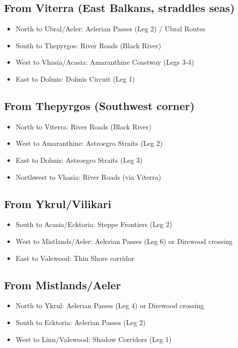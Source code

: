 \documentclass[12pt,oneside]{book}
\begin{document}
\subsection{From Viterra (East Balkans, straddles seas)}
\begin{itemize}
\item North to Ubral/Aeler: Aelerian Passes (Leg 2) / Ubral Routes
\item South to Thepyrgos: River Roads (Black River)
\item West to Vhasia/Acasia: Amaranthine Coastway (Legs 3-4)
\item East to Dolmis: Dolmis Circuit (Leg 1)
\end{itemize}

\subsection{From Thepyrgos (Southwest corner)}
\begin{itemize}
\item North to Viterra: River Roads (Black River)
\item West to Amaranthine: Astroegro Straits (Leg 2)
\item East to Dolmis: Astroegro Straits (Leg 3)
\item Northwest to Vhasia: River Roads (via Viterra)
\end{itemize}

\subsection{From Ykrul/Vilikari}
\begin{itemize}
\item South to Acasia/Ecktoria: Steppe Frontiers (Leg 2)
\item West to Mistlands/Aeler: Aelerian Passes (Leg 6) or Direwood crossing
\item East to Valewood: Thin Shore corridor
\end{itemize}

\subsection{From Mistlands/Aeler}
\begin{itemize}
\item North to Ykrul: Aelerian Passes (Leg 4) or Direwood crossing
\item South to Ecktoria: Aelerian Passes (Leg 2)
\item West to Linn/Valewood: Shadow Corridors (Leg 1)
\end{itemize}
\end{document}
